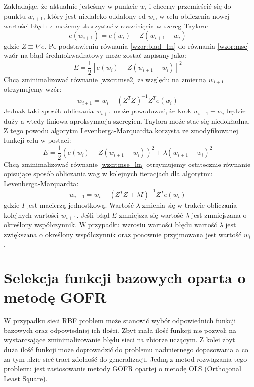 Zakładając, że aktualnie jesteśmy w punkcie $w_{i}$ i chcemy przemieścić się do punktu $w_{i+1}$, który jest niedaleko oddalony od $w_{i}$, w celu obliczenia nowej wartości błędu $e$ możemy skorzystać z rozwinięcia w szereg Taylora:
\begin{equation}
	\label{wzor:blad_lm}
	e(w_{i+1}) = e(w_{i}) + Z(w_{i+1} - w_{i})
\end{equation}
gdzie $Z \equiv \nabla e$. Po podstawieniu równania \ref{wzor:blad_lm} do równania \ref{wzor:mse} wzór na błąd średniokwadratowy może zostać zapisany jako:
\begin{equation}
	\label{wzor:mse2}
	E = \frac{1}{2}[e(w_{i}) + Z(w_{i+1} - w_{i})]^2
\end{equation}
Chcą zminimalizować równanie \ref{wzor:mse2} ze względu na zmienną $w_{i+1}$ otrzymujemy wzór:
\begin{equation}
	w_{i+1} = w_{i} - (Z^TZ)^{-1}Z^Te(w_{i})
\end{equation}
Jednak taki sposób obliczania $w_{i+1}$ może powodować, że krok $w_{i+1} - w_{i}$ będzie duży a wtedy liniowa aproksymacja szeregiem Taylora może stać się niedokładna. Z tego powodu algorytm Levenberga-Marquardta korzysta ze zmodyfikowanej funkcji celu w postaci:
\begin{equation}
	\label{wzor:mse_lm}
	E = \frac{1}{2}(e(w_{i}) + Z(w_{i+1} - w_{i}))^2 + \lambda (w_{i+1} - w_{i})^2
\end{equation}
Chcą zminimalizować równanie \ref{wzor:mse_lm} otrzymujemy ostatecznie równanie opisujące sposób obliczania wag w kolejnych iteracjach dla algorytmu Levenberga-Marquardta:
\begin{equation}
	w_{i+1} = w_{i} -(Z^TZ + \lambda I)^{-1}Z^Te(w_{i})
\end{equation}
gdzie $I$ jest macierzą jednostkową. Wartość $\lambda$ zmienia się w trakcie obliczania kolejnych wartości $w_{i+1}$. Jeśli błąd $E$ zmniejsza się wartość $\lambda$ jest zmniejszana o określony współczynnik. W przypadku wzrostu wartości błędu wartość $\lambda$ jest zwiększana o określony współczynnik oraz ponownie przyjmowana jest wartość $w_i$.



\newpage
\section{Selekcja funkcji bazowych oparta o metodę GOFR}
W przypadku sieci RBF problem może stanowić wybór odpowiednich funkcji bazowych oraz odpowiedniej ich ilości. Zbyt mała ilość funkcji nie pozwoli na wystarczające zminimalizowanie błędu sieci na zbiorze uczącym. Z kolei zbyt duża ilość funkcji może doprowadzić do problemu nadmiernego dopasowania a co za tym idzie sieć traci zdolność do generalizacji. Jedną z metod rozwiązania tego problemu jest zastosowanie metody GOFR opartej o metodę OLS (Orthogonal Least Square). 

